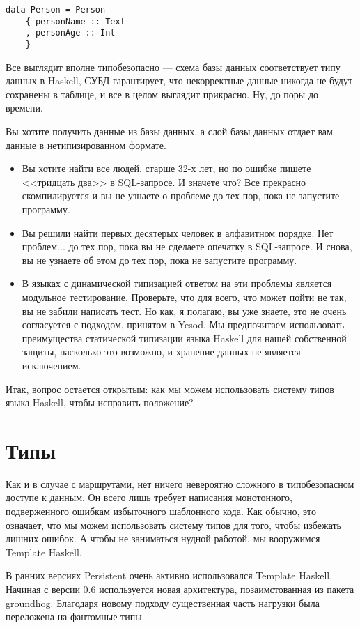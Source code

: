 \begin{lstlisting}
data Person = Person
    { personName :: Text
    , personAge :: Int
    }
\end{lstlisting}

Все выглядит вполне типобезопасно --- схема базы данных соответствует типу данных в Haskell, СУБД гарантирует, что некорректные данные никогда не будут сохранены в таблице, и все в целом выглядит прикрасно. Ну, до поры до времени.

Вы хотите получить данные из базы данных, а слой базы данных отдает вам данные в нетипизированном формате.

\begin{itemize}
  \item Вы хотите найти все людей, старше 32-х лет, но по ошибке пишете <<тридцать два>> в SQL-запросе. И значете что? Все прекрасно скомпилируется и вы не узнаете о проблеме до тех пор, пока не запустите программу.
  \item Вы решили найти первых десятерых человек в алфавитном порядке. Нет проблем... до тех пор, пока вы не сделаете опечатку в SQL-запросе. И снова, вы не узнаете об этом до тех пор, пока не запустите программу.
  \item В языках с динамической типизацией ответом на эти проблемы является модульное тестирование. Проверьте, что для всего, что может пойти не так, вы не забили написать тест. Но как, я полагаю, вы уже знаете, это не очень согласуется с подходом, принятом в Yesod. Мы предпочитаем использовать преимущества статической типизации языка Haskell для нашей собственной защиты, насколько это возможно, и хранение данных не является исключением.
\end{itemize}

Итак, вопрос остается открытым: как мы можем использовать систему типов языка Haskell, чтобы исправить положение?

\section{Типы} %

Как и в случае с маршрутами, нет ничего невероятно сложного в типобезопасном доступе к данным. Он всего лишь требует написания монотонного, подверженного ошибкам избыточного шаблонного кода. Как обычно, это означает, что мы можем использовать систему типов для того, чтобы избежать лишних ошибок. А чтобы не заниматься нудной работой, мы вооружимся Template Haskell.

\begin{remark}
В ранних версиях Persistent очень активно использовался Template Haskell. Начиная с версии 0.6 используется новая архитектура, позаимстованная из пакета groundhog. Благодаря новому подходу существенная часть нагрузки была переложена на фантомные типы.
\end{remark}

